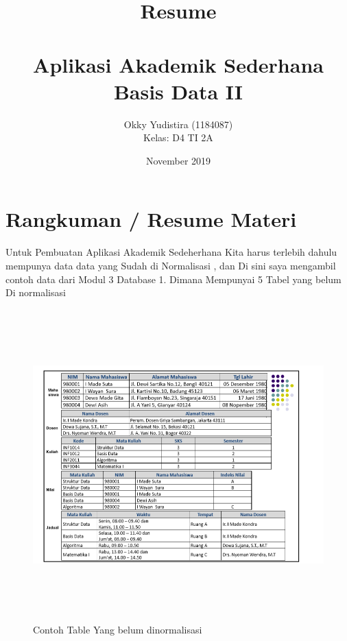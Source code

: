 \documentclass[a4, 13pt]{article}
\title{Resume \\ \vspace{0.3cm }\\ Aplikasi Akademik Sederhana\\ Basis Data II}
\author{Okky Yudistira (1184087) \\ Kelas: D4 TI 2A \vspace{0.3cm} }
\date{November 2019}
\begin{document}
\section{Rangkuman / Resume Materi}
Untuk Pembuatan Aplikasi Akademik Sedeherhana Kita harus terlebih dahulu mempunya data data yang
Sudah di Normalisasi , dan Di sini saya mengambil contoh data dari Modul 3 Database 1. Dimana Mempunyai
5 Tabel yang belum Di normalisasi
\begin{figure}[!htbp]
        \centering
        \includegraphics[width=16cm, height=12cm]{pictures/1.png}
        \caption{Contoh Table Yang belum dinormalisasi}
        \label{fig:my_label}
    \end{figure}
    \vspace{2cm}
    
\end{document}
